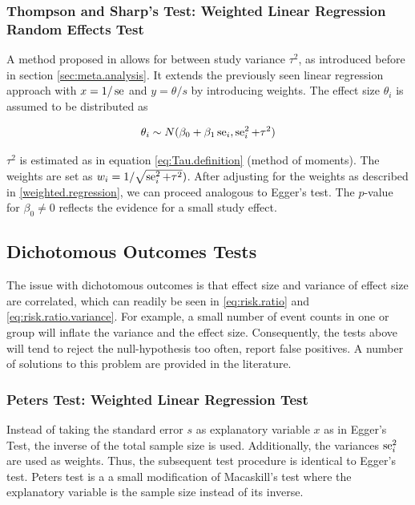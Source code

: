 \documentclass[11pt,a4paper,twoside]{book}\usepackage[]{graphicx}\usepackage[]{color}
\begin{document}
\subsubsection{Thompson and Sharp's Test: Weighted Linear Regression Random Effects Test} \label{sec:Thompson}
A method proposed in \citet{thompson.sharp} allows for between study variance $\tau^2$, as introduced before in section \ref{sec:meta.analysis}. It extends the previously seen linear regression approach with $x = 1/\operatorname{se}$ and $y = \theta/s$ by introducing weights. The effect size $\theta_i$ is assumed to be distributed as

\begin{align}
\theta_i \sim N(\beta_0 + \beta_1 \operatorname{se}_i, \operatorname{se}_i^2 + \tau^2) \label{t.sharp.regression}
\end{align}

$\tau^2$ is estimated as in equation \ref{eq:Tau.definition} (method of moments). %
The weights are set as $w_i = 1/\sqrt{\operatorname{se}_i^2 + \tau^2})$. After adjusting for the weights as described in \ref{weighted.regression}, we can proceed analogous to Egger's test. The $p$-value for $\beta_{0} \neq 0$ reflects the evidence for a small study effect.

\subsection{Dichotomous Outcomes Tests}
 
The issue with dichotomous outcomes is that effect size and variance of effect size are correlated, which can readily be seen in \ref{eq:risk.ratio} and \ref{eq:risk.ratio.variance}. For example, a small number of event counts in one or group will inflate the variance and the effect size. Consequently, the tests above will tend to reject the null-hypothesis too often, \ie report false positives. A number of solutions to this problem are provided in the literature.


\subsubsection{Peters Test: Weighted Linear Regression Test} \label{sec:Peter}
Instead of taking the standard error $s$ as explanatory variable $x$ as in Egger's Test, the inverse of the total sample size is used. Additionally, the variances $\operatorname{se}_i^2$ are used as weights. Thus, the subsequent test procedure is identical to Egger's test. Peters test is a a small modification of Macaskill's test where the explanatory variable is the sample size instead of its inverse.
\end{document}
